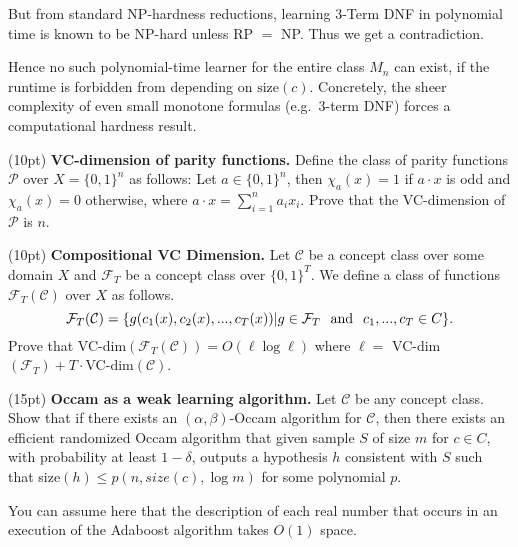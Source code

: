 \documentclass[11pt]{article}
\DeclareMathOperator{\1}{\mathbbm{1}}
\begin{document}
But from standard NP-hardness reductions, learning 3-Term DNF in polynomial time is known to be NP-hard unless RP $=$ NP.  Thus we get a contradiction.

Hence no such polynomial-time learner for the entire class $M_n$ can exist, if the runtime is forbidden from depending on $\text{size}(c)$.  Concretely, the sheer complexity of even small monotone formulas (e.g.\ 3-term DNF) forces a computational hardness result.

\begin{problem} (10pt) \textbf{VC-dimension of parity functions.}
Define the class of parity functions ${\mathcal P}$ over $X = \{0, 1\}^n$ as
follows: Let $a \in \{0, 1\}^n$, then $\chi_a(x) = 1$ if $a \cdot x$ is odd and
$\chi_a(x) = 0$ otherwise, where $a \cdot x = \sum_{i=1}^n a_i x_i$. Prove that the VC-dimension of ${\mathcal P}$ is $n$. 

\end{problem}



\begin{problem} (10pt) \textbf{Compositional VC Dimension.}
Let $\mathcal{C}$ be a concept class over some domain $X$ and $\mathcal{F}_T$ be a concept class over $\{0, 1\}^T$. We define a class of functions $\mathcal{F}_T(\mathcal{C})$ over $X$ as follows. 
\[\mathcal{F}_T(\mathcal{C}) = \{g(c_1(x), c_2(x), . . . , c_T(x)) | g \in \mathcal{F}_T \hspace{0.25cm} \text{\rm and} \hspace{0.25cm} c_1, . . . , c_T \in C\}.\] 
Prove that VC-dim$(\mathcal{F}_T(\mathcal{C})) = O(\ell \log \ell)$ where $\ell =$ VC-dim$(\mathcal{F}_T) + T \cdot $VC-dim$(\mathcal{C})$. 
\end{problem}




\begin{problem}(15pt) \textbf{Occam as a weak learning algorithm.} Let $\mathcal{C}$ be any concept class. Show that if there exists an $(\alpha, \beta)$-Occam algorithm for $\mathcal{C}$, then there exists an efficient randomized Occam algorithm that given sample $S$ of size $m$ for $c \in C$, with probability at least $1 - \delta$, outputs a hypothesis $h$ consistent with $S$ such that size$(h) \leq p(n,size(c), \log m)$ for some polynomial $p$.
\end{problem}

\begin{hint}
    You can assume here that the description of each real number that occurs in an execution of the Adaboost algorithm takes $O(1)$ space.
\end{hint}
\end{document}
